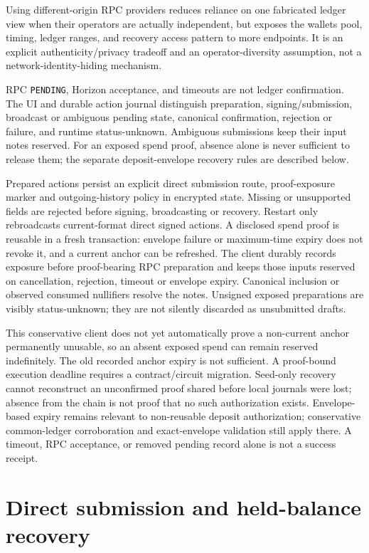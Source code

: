 \documentclass[11pt,letterpaper]{article}
\begin{document}
Using different-origin RPC providers reduces reliance on one fabricated
ledger view when their operators are actually independent, but exposes
the wallet\textquotesingle s pool, timing, ledger ranges, and recovery
access pattern to more endpoints. It is an explicit
authenticity/\allowbreak{}privacy tradeoff and an operator-diversity
assumption, not a network-identity-hiding mechanism.

RPC \texttt{PENDING}, Horizon acceptance, and timeouts are not ledger
confirmation. The UI and durable action journal distinguish preparation,
signing/\allowbreak{}submission, broadcast or ambiguous pending state,
canonical confirmation, rejection or failure, and runtime
status-unknown. Ambiguous submissions keep their input notes reserved.
For an exposed spend proof, absence alone is never sufficient to release
them; the separate deposit-envelope recovery rules are described below.

Prepared actions persist an explicit direct submission route,
proof-exposure marker and outgoing-history policy in encrypted state.
Missing or unsupported fields are rejected before signing, broadcasting
or recovery. Restart only rebroadcasts current-format direct signed
actions. A disclosed spend proof is reusable in a fresh transaction:
envelope failure or maximum-time expiry does not revoke it, and a
current anchor can be refreshed. The client durably records exposure
before proof-bearing RPC preparation and keeps those inputs reserved on
cancellation, rejection, timeout or envelope expiry. Canonical inclusion
or observed consumed nullifiers resolve the notes. Unsigned exposed
preparations are visibly status-unknown; they are not silently discarded
as unsubmitted drafts.

This conservative client does not yet automatically prove a non-current
anchor permanently unusable, so an absent exposed spend can remain
reserved indefinitely. The old recorded anchor expiry is not sufficient.
A proof-bound execution deadline requires a
contract/\allowbreak{}circuit migration. Seed-only recovery cannot
reconstruct an unconfirmed proof shared before local journals were lost;
absence from the chain is not proof that no such authorization exists.
Envelope-based expiry remains relevant to non-reusable deposit
authorization; conservative common-ledger corroboration and
exact-envelope validation still apply there. A timeout, RPC acceptance,
or removed pending record alone is not a success receipt.

\section{Direct submission and held-balance
recovery}\label{direct-submission-and-held-balance-recovery}
\end{document}
